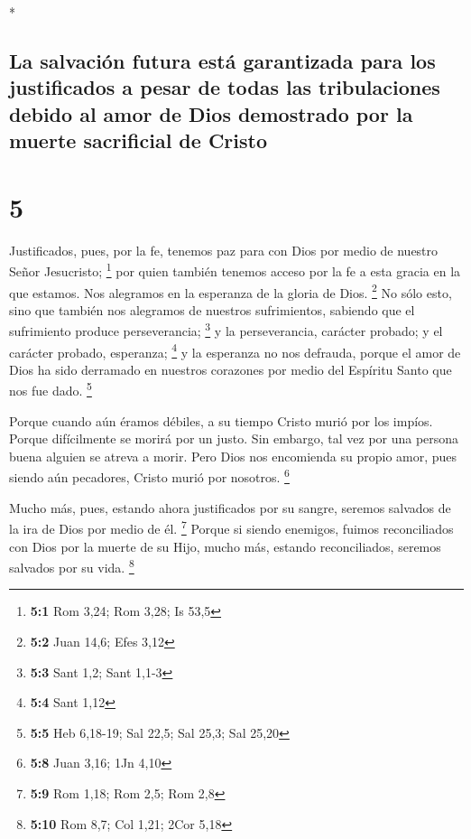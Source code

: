 \begin{paracol}{2}
\begin{otherlanguage}{english}
\end{otherlanguage}

\switchcolumn[0]*

\hypertarget{la-salvaciuxf3n-futura-estuxe1-garantizada-para-los-justificados-a-pesar-de-todas-las-tribulaciones-debido-al-amor-de-dios-demostrado-por-la-muerte-sacrificial-de-cristo}{%
\subsection{La salvación futura está garantizada para los justificados a
pesar de todas las tribulaciones debido al amor de Dios demostrado por
la muerte sacrificial de
Cristo}\label{la-salvaciuxf3n-futura-estuxe1-garantizada-para-los-justificados-a-pesar-de-todas-las-tribulaciones-debido-al-amor-de-dios-demostrado-por-la-muerte-sacrificial-de-cristo}}

\hypertarget{section-8}{%
\section{5}\label{section-8}}

 Justificados, pues, por la fe, tenemos paz para con Dios
por medio de nuestro Señor Jesucristo; \footnote{\textbf{5:1} Rom 3,24;
  Rom 3,28; Is 53,5}  por quien también tenemos acceso por
la fe a esta gracia en la que estamos. Nos alegramos en la esperanza de
la gloria de Dios. \footnote{\textbf{5:2} Juan 14,6; Efes 3,12}
 No sólo esto, sino que también nos alegramos de nuestros
sufrimientos, sabiendo que el sufrimiento produce perseverancia;
\footnote{\textbf{5:3} Sant 1,2; Sant 1,1-3}  y la
perseverancia, carácter probado; y el carácter probado, esperanza;
\footnote{\textbf{5:4} Sant 1,12}  y la esperanza no nos
defrauda, porque el amor de Dios ha sido derramado en nuestros corazones
por medio del Espíritu Santo que nos fue dado. \footnote{\textbf{5:5}
  Heb 6,18-19; Sal 22,5; Sal 25,3; Sal 25,20}

 Porque cuando aún éramos débiles, a su tiempo Cristo
murió por los impíos.  Porque difícilmente se morirá por
un justo. Sin embargo, tal vez por una persona buena alguien se atreva a
morir.  Pero Dios nos encomienda su propio amor, pues
siendo aún pecadores, Cristo murió por nosotros. \footnote{\textbf{5:8}
  Juan 3,16; 1Jn 4,10}

 Mucho más, pues, estando ahora justificados por su
sangre, seremos salvados de la ira de Dios por medio de él. \footnote{\textbf{5:9}
  Rom 1,18; Rom 2,5; Rom 2,8}  Porque si siendo enemigos,
fuimos reconciliados con Dios por la muerte de su Hijo, mucho más,
estando reconciliados, seremos salvados por su vida. \footnote{\textbf{5:10}
  Rom 8,7; Col 1,21; 2Cor 5,18}


\end{paracol}
